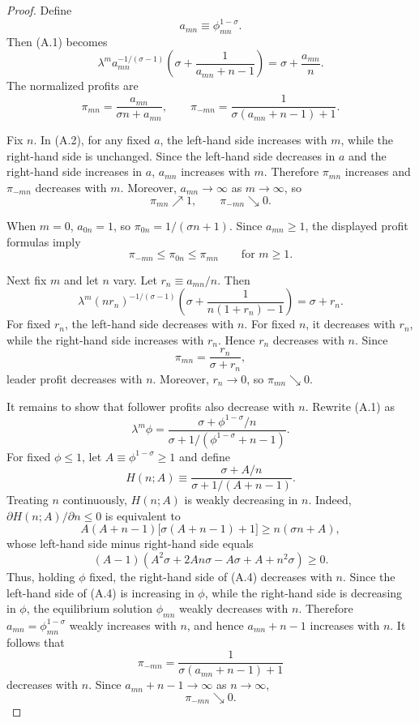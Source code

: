 \documentclass[12pt]{article}
\begin{document}
\begin{proof}
Define
\[ a_{mn}\equiv \phi_{mn}^{1-\sigma}. \]
Then (A.1) becomes
\[ \lambda^m a_{mn}^{-1/(\sigma-1)} \left( \sigma+\frac{1}{a_{mn}+n-1} \right)
= \sigma+\frac{a_{mn}}{n}. \tag{A.2} \]
The normalized profits are
\[ \pi_{mn}=\frac{a_{mn}}{\sigma n+a_{mn}}, \qquad \pi_{-mn}=\frac{1}{\sigma(a_{mn}+n-1)+1}. \]

Fix \(n\). In (A.2), for any fixed \(a\), the left-hand side increases with \(m\), while the right-hand side is unchanged. Since the left-hand side decreases in \(a\) and the right-hand side increases in \(a\), \(a_{mn}\) increases with \(m\). Therefore \(\pi_{mn}\) increases and \(\pi_{-mn}\) decreases with \(m\). Moreover, \(a_{mn}\to\infty\) as \(m\to\infty\), so
\[ \pi_{mn}\nearrow1, \qquad \pi_{-mn}\searrow0.\]

When \(m=0\), \(a_{0n}=1\), so \(\pi_{0n}=1/(\sigma n+1)\). Since \(a_{mn}\geq1\), the displayed profit formulas imply
\[
\pi_{-mn}\leq\pi_{0n}\leq\pi_{mn}
\qquad\text{for }m\geq1.
\]

Next fix \(m\) and let \(n\) vary. Let \(r_n\equiv a_{mn}/n\). Then
\[ \lambda^m(nr_n)^{-1/(\sigma-1)} \left( \sigma+\frac{1}{n(1+r_n)-1} \right)
= \sigma+r_n . \tag{A.3} \]
For fixed \(r_n\), the left-hand side decreases with \(n\). For fixed \(n\), it decreases with \(r_n\), while the right-hand side increases with \(r_n\). Hence \(r_n\) decreases with \(n\). Since
\[
\pi_{mn}=\frac{r_n}{\sigma+r_n},
\]
leader profit decreases with \(n\). Moreover, \(r_n\to0\), so \(\pi_{mn}\searrow0\).

It remains to show that follower profits also decrease with \(n\). Rewrite (A.1) as
\[ \lambda^m\phi=\frac{\sigma+\phi^{1-\sigma}/n}{\sigma+1/(\phi^{1-\sigma}+n-1)}. \tag{A.4}\]
For fixed \(\phi\leq1\), let \(A\equiv\phi^{1-\sigma}\geq1\) and define
\[H(n;A) \equiv \frac{\sigma+A/n}{\sigma+1/(A+n-1)} .\]
Treating \(n\) continuously, \(H(n;A)\) is weakly decreasing in \(n\). Indeed,
\(\partial H(n;A)/\partial n\leq0\) is equivalent to
\[A(A+n-1)\bigl[\sigma(A+n-1)+1\bigr]\geq n(\sigma n+A),\]
whose left-hand side minus right-hand side equals
\[(A-1)\left(A^2\sigma+2An\sigma-A\sigma+A+n^2\sigma\right)\geq0.\]
Thus, holding \(\phi\) fixed, the right-hand side of (A.4) decreases with \(n\). Since the left-hand side of (A.4) is increasing in \(\phi\), while the right-hand side is decreasing in \(\phi\), the equilibrium solution \(\phi_{mn}\) weakly decreases with \(n\). Therefore \(a_{mn}=\phi_{mn}^{1-\sigma}\) weakly increases with \(n\), and hence \(a_{mn}+n-1\) increases with \(n\). It follows that
\[\pi_{-mn}=\frac{1}{\sigma(a_{mn}+n-1)+1}\]
decreases with \(n\). Since \(a_{mn}+n-1\to\infty\) as \(n\to\infty\),
\[\pi_{-mn}\searrow0 .\]


\end{proof}
\end{document}
